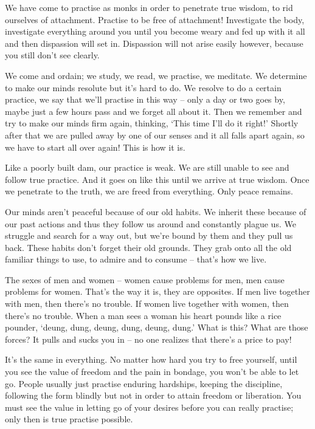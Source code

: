 We have come to practise as monks in order to penetrate true wisdom, to rid ourselves of attachment. Practise to be free of attachment! Investigate the body, investigate everything around you until you become weary and fed up with it all and then dispassion will set in. Dispassion will not arise easily however, because you still don't see clearly.

We come and ordain; we study, we read, we practise, we meditate. We determine to make our minds resolute but it's hard to do. We resolve to do a certain practice, we say that we'll practise in this way -- only a day or two goes by, maybe just a few hours pass and we forget all about it. Then we remember and try to make our minds firm again, thinking, `This time I'll do it right!' Shortly after that we are pulled away by one of our senses and it all falls apart again, so we have to start all over again! This is how it is.

Like a poorly built dam, our practice is weak. We are still unable to see and follow true practice. And it goes on like this until we arrive at true wisdom. Once we penetrate to the truth, we are freed from everything. Only peace remains.

Our minds aren't peaceful because of our old habits. We inherit these because of our past actions and thus they follow us around and constantly plague us. We struggle and search for a way out, but we're bound by them and they pull us back. These habits don't forget their old grounds. They grab onto all the old familiar things to use, to admire and to consume -- that's how we live.

The sexes of men and women -- women cause problems for men, men cause problems for women. That's the way it is, they are opposites. If men live together with men, then there's no trouble. If women live together with women, then there's no trouble. When a man sees a woman his heart pounds like a rice pounder, `deung, dung, deung, dung, deung, dung.' What is this? What are those forces? It pulls and sucks you in -- no one realizes that there's a price to pay!

It's the same in everything. No matter how hard you try to free yourself, until you see the value of freedom and the pain in bondage, you won't be able to let go. People usually just practise enduring hardships, keeping the discipline, following the form blindly but not in order to attain freedom or liberation. You must see the value in letting go of your desires before you can really practise; only then is true practise possible.

